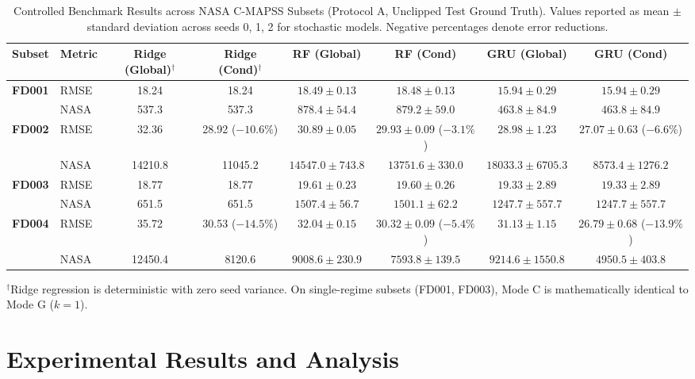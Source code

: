 \documentclass[conference]{IEEEtran}
\begin{document}
\begin{table}[t]
\caption{Controlled Benchmark Results across NASA C-MAPSS Subsets (Protocol A, Unclipped Test Ground Truth). Values reported as mean $\pm$ standard deviation across seeds 0, 1, 2 for stochastic models. Negative percentages denote error reductions.}
\label{tab:main_results}
\centering
\begin{tabular}{llcccccc}
\toprule
Subset & Metric & Ridge (Global)$^\dagger$ & Ridge (Cond)$^\dagger$ & RF (Global) & RF (Cond) & GRU (Global) & GRU (Cond) \\
\midrule
\multirow{2}{*}{\textbf{FD001}} & RMSE & 18.24 & 18.24 & $18.49 \pm 0.13$ & $18.48 \pm 0.13$ & $15.94 \pm 0.29$ & $15.94 \pm 0.29$ \\
 & NASA & 537.3 & 537.3 & $878.4 \pm 54.4$ & $879.2 \pm 59.0$ & $463.8 \pm 84.9$ & $463.8 \pm 84.9$ \\
\midrule
\multirow{2}{*}{\textbf{FD002}} & RMSE & 32.36 & 28.92 ($-10.6\%$) & $30.89 \pm 0.05$ & $29.93 \pm 0.09$ ($-3.1\%$) & $28.98 \pm 1.23$ & $\mathbf{27.07 \pm 0.63}$ ($\mathbf{-6.6\%}$) \\
 & NASA & 14210.8 & 11045.2 & $14547.0 \pm 743.8$ & $13751.6 \pm 330.0$ & $18033.3 \pm 6705.3$ & $\mathbf{8573.4 \pm 1276.2}$ \\
\midrule
\multirow{2}{*}{\textbf{FD003}} & RMSE & 18.77 & 18.77 & $19.61 \pm 0.23$ & $19.60 \pm 0.26$ & $19.33 \pm 2.89$ & $19.33 \pm 2.89$ \\
 & NASA & 651.5 & 651.5 & $1507.4 \pm 56.7$ & $1501.1 \pm 62.2$ & $1247.7 \pm 557.7$ & $1247.7 \pm 557.7$ \\
\midrule
\multirow{2}{*}{\textbf{FD004}} & RMSE & 35.72 & 30.53 ($-14.5\%$) & $32.04 \pm 0.15$ & $30.32 \pm 0.09$ ($-5.4\%$) & $31.13 \pm 1.15$ & $\mathbf{26.79 \pm 0.68}$ ($\mathbf{-13.9\%}$) \\
 & NASA & 12450.4 & 8120.6 & $9008.6 \pm 230.9$ & $7593.8 \pm 139.5$ & $9214.6 \pm 1550.8$ & $\mathbf{4950.5 \pm 403.8}$ \\
\bottomrule
\end{tabular}
\begin{flushleft}
\footnotesize $^\dagger$Ridge regression is deterministic with zero seed variance. On single-regime subsets (FD001, FD003), Mode C is mathematically identical to Mode G ($k=1$).
\end{flushleft}
\end{table}

\section{Experimental Results and Analysis}
\end{document}
